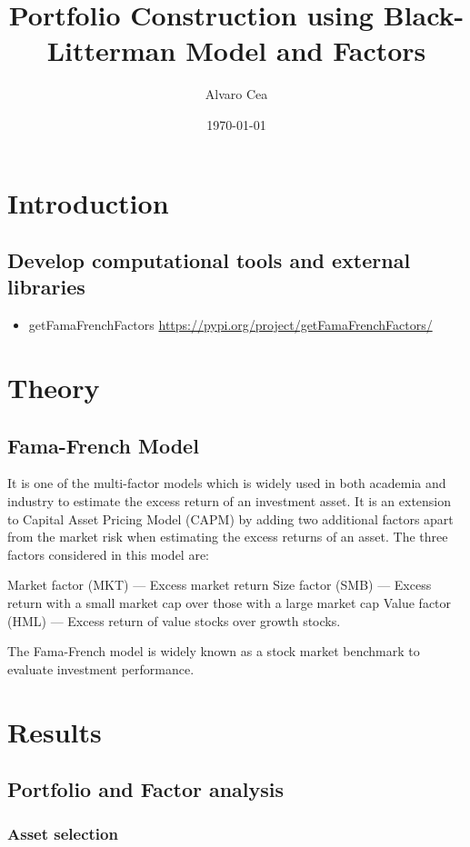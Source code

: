\documentclass[11pt]{article}
\author{Alvaro Cea}
\date{\today}
\title{Portfolio Construction using Black-Litterman Model and Factors}
\begin{document}
\maketitle
\tableofcontents


\section{Introduction}
\label{sec:orgd6e3095}
\subsection{Develop computational tools and external libraries}
\label{sec:org4e2df7b}
\begin{itemize}
\item getFamaFrenchFactors
\url{https://pypi.org/project/getFamaFrenchFactors/}
\end{itemize}
\section{Theory}
\label{sec:org2946104}
\subsection{Fama-French Model}
\label{sec:orge8cd720}

It is one of the multi-factor models which is widely used in both academia and industry to estimate the excess return of an investment asset. It is an extension to Capital Asset Pricing Model (CAPM) by adding two additional factors apart from the market risk when estimating the excess returns of an asset. The three factors considered in this model are:

Market factor (MKT) — Excess market return
Size factor (SMB) — Excess return with a small market cap over those with a large market cap
Value factor (HML) — Excess return of value stocks over growth stocks.

The Fama-French model is widely known as a stock market benchmark to evaluate investment performance.

\section{Results}
\label{sec:org419c8e0}
\subsection{Portfolio and Factor analysis}
\label{sec:org68f556d}
\subsubsection{Asset selection}
\label{sec:orgb26da2f}
\end{document}
